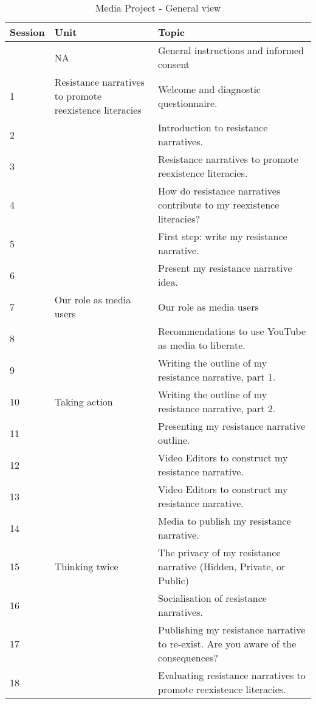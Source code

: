 {
	\renewcommand{\arraystretch}{1.8}
	\begin{table}[htpb]
		\centering
		\begin{threeparttable}
			\caption{Media Project - General view}
			\label{tb1}
			\begin{tabular}{lp{4cm}p{6cm}}
				\toprule
				Session & Unit & Topic \\
				\midrule
				& NA & General instructions and informed consent \\
				1 & Resistance narratives to promote reexistence literacies & Welcome and diagnostic questionnaire. \\
				2 & & Introduction to resistance narratives. \\
				3 & & Resistance narratives to promote reexistence literacies. \\
				4 & & How do resistance narratives contribute to my reexistence literacies? \\
				5 & & First step: write my resistance narrative. \\
				6 & & Present my resistance narrative idea. \\
				7 & Our role as media users & Our role as media users \\
				8 & & Recommendations to use YouTube as media to liberate. \\
				9 & & Writing the outline of my resistance narrative, part 1. \\
				10 & Taking action & Writing the outline of my resistance narrative, part 2. \\
				11 & & Presenting my resistance narrative outline. \\
				12 & & Video Editors to construct my resistance narrative. \\
				13 & & Video Editors to construct my resistance narrative. \\
				14 & & Media to publish my resistance narrative. \\
				15 & Thinking twice & The privacy of my resistance narrative (Hidden, Private, or Public) \\
				16 & & Socialisation of resistance narratives. \\
				17 & & Publishing my resistance narrative to re-exist. Are you aware of the consequences? \\
				18 & & Evaluating resistance narratives to promote reexistence literacies. \\
				\bottomrule
			\end{tabular}
		\end{threeparttable}
	\end{table}
}
